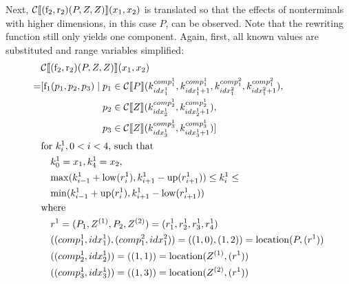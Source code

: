 \documentclass[
    a4paper,
    12pt,
    twoside,
    BCOR=12mm,
    parskip=half,
    chapterprefix,
    numbers=noenddot,
    bibliography=totoc
]{scrbook}
\begin{document}
Next, $\mathcal{C}\llbracket (\op{f}_2,\op{r}_2)(P,Z,Z) \rrbracket(x_1,x_2)$ is translated so that the effects of nonterminals with higher dimensions, in this case $P$, can be observed. Note that the rewriting function still only yields one component. Again, first, all known values are substituted and range variables simplified:
\begin{align*}
    &\mathcal{C} \llbracket (\op{f}_2,\op{r}_2)(P,Z,Z) \rrbracket (x_1,x_2) \\
  = &\!\begin{aligned}[t]
    [ \op{f}_1(p_1,p_2,p_3) \mid \; &p_1 \in \mathcal{C}\llbracket P \rrbracket (k^{comp^1_1}_{idx^1_1},k^{comp^1_1}_{idx^1_1 + 1},k^{comp^2_1}_{idx^2_1},k^{comp^2_1}_{idx^2_1 + 1}),\\
    &p_2 \in \mathcal{C}\llbracket Z \rrbracket (k^{comp^1_2}_{idx^1_2},k^{comp^1_2}_{idx^1_2 + 1}),\\
    &p_3 \in \mathcal{C}\llbracket Z \rrbracket (k^{comp^1_3}_{idx^1_3},k^{comp^1_3}_{idx^1_3 + 1})
    ]
    \end{aligned} \\
    &\text{for $k^1_i, 0 < i < 4$, such that}\\
      &\quad k^1_0 = x_1, k^1_4 = x_2,\\
      &\quad\!\max(k^1_{i-1} + \op{low}(r^1_i), k^1_{i+1} - \op{up}(r^1_{i+1})) \leq k^1_i \leq\\
      &\quad\!\min(k^1_{i-1} + \op{up}(r^1_i), k^1_{i+1} - \op{low}(r^1_{i+1}))\\
      &\text{where}\\
      &\quad r^1 = (P_1,Z^{(1)},P_2,Z^{(2)}) = (r^1_1, r^1_2, r^1_3, r^1_4)\\
      &\quad ((comp^1_1, idx^1_1),(comp^2_1, idx^2_1))=((1,0),(1,2))=\op{location}(P,(r^1))\\
      &\quad ((comp^1_2, idx^1_2))=((1,1))=\op{location}(Z^{(1)},(r^1))\\
      &\quad ((comp^1_3, idx^1_3))=((1,3))=\op{location}(Z^{(2)},(r^1))
\end{align*}
\end{document}
